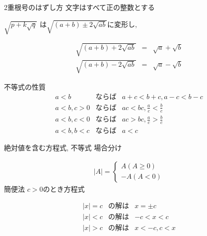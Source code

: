 \documentclass[aspectratio=169, 12pt]{beamer} %
\begin{document}
\begin{frame}{2重根号のはずし方}
    文字はすべて正の整数とする \par
    $\sqrt{p+k\sqrt{q}}$ は$\sqrt{(a+b)\pm 2\sqrt{ab}}$に変形し, \par
    \begin{eqnarray*}
        \sqrt{(a+b)+2\sqrt{ab}}&=&\sqrt{a}+\sqrt{b} \\
        \sqrt{(a+b)-2\sqrt{ab}}&=&\sqrt{a}-\sqrt{b}
    \end{eqnarray*}
\end{frame}
\begin{frame}{不等式の性質}
    \begin{eqnarray*}
        a<b&ならば&a+c<b+c, a-c<b-c \\
        a<b, c>0&ならば&ac<bc, \frac{a}{c}<\frac{b}{c} \\
        a<b, c<0&ならば&ac>bc, \frac{a}{c}>\frac{b}{c} \\
        a<b, b<c&ならば&a<c
    \end{eqnarray*}
\end{frame}
\begin{frame}{絶対値を含む方程式, 不等式}
    場合分け\par
    \begin{eqnarray*}
        |A|=
        \begin{cases}
            A (A\geq 0) \\
            -A (A < 0)
        \end{cases}
    \end{eqnarray*}
    簡便法 $c>0$のとき方程式 \par
    \begin{eqnarray*}
        |x|=c&の解は&x=\pm c \\
        |x|<c&の解は&-c<x<c \\
        |x|>c&の解は&x<-c, c<x
    \end{eqnarray*}
\end{frame}
\end{document}
